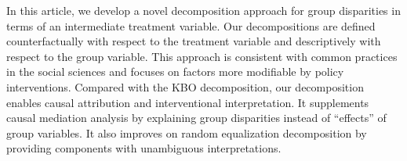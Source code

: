 \documentclass[12pt,a4paper]{article}
\begin{document}

In this article, we develop a novel decomposition approach for group disparities in terms of an intermediate treatment variable. Our decompositions are defined counterfactually with respect to the treatment variable and descriptively with respect to the group variable. This approach is consistent with common practices in the social sciences and focuses on factors more modifiable by policy interventions. Compared with the KBO decomposition, our decomposition enables causal attribution and  interventional interpretation. It supplements causal mediation analysis by explaining group disparities instead of ``effects'' of group variables. It also improves on random equalization decomposition by providing components with unambiguous interpretations.
\end{document}
